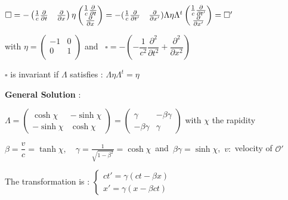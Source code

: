 \item $\square 
=-\left( \frac{1}{c} \frac{\partial}{\partial t} \quad \frac{\partial}{\partial x}\right) \eta
    \begin{pmatrix}
        \frac{1}{c}\frac{\partial}{\partial t}\\
	    \frac{\partial}{\partial x} 
	\end{pmatrix}
= -( \frac{1}{c} \frac{\partial }{\partial t'} \quad \frac{\partial }{\partial x'} )
 \Lambda \eta \Lambda^t \begin{pmatrix}
     \frac{1}{c}\frac{\partial }{\partial t'} \\
     \frac{\partial }{\partial x'}
 \end{pmatrix}
 =\square'$
 \item[] 
     with $\eta = 
    \begin{pmatrix}
	     -1 & 0 \\
		  0 & 1 \\
	\end{pmatrix}$ and \ $ \square=-\left( -\dfrac{1}{c^2}\dfrac{\partial^2}{\partial t^2} + \dfrac{\partial^2}{\partial x^2}\right)$ \\


\item $\square$ is invariant if $\Lambda$ satisfies : $\Lambda \eta \Lambda^t = \eta$ \\ 

\item[] \textbf{General Solution} : 
\item $ \Lambda = 
\begin{pmatrix}
\cosh \chi & -\sinh \chi \\
-\sinh \chi & \cosh \chi
\end{pmatrix}
= 
\begin{pmatrix}
    \gamma & -\beta\gamma \\
    -\beta\gamma & \gamma
\end{pmatrix}$ with $\chi$ the rapidity%

\item $\beta = \dfrac{v}{c} = \tanh \chi, \quad \gamma = \frac{1}{\sqrt{1-\beta^2}} = \cosh\chi \,$ and $\, \beta\gamma = \sinh\chi$, $\, v :$ velocity of $\mathcal{O}'$\\

\item  {The transformation is } : 
$\begin{cases}
ct' = \gamma (ct - \beta x) \\
x' = \gamma (x - \beta c t)
\end{cases}$

